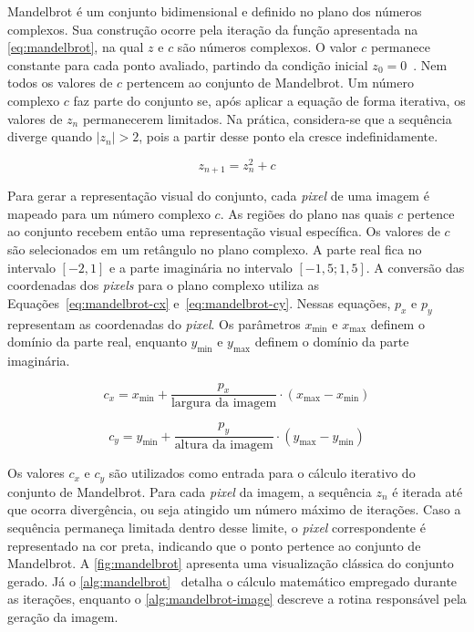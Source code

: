 Mandelbrot é um conjunto bidimensional e definido no plano dos números complexos. Sua construção ocorre pela iteração da função apresentada na \autoref{eq:mandelbrot}, na qual $z$ e $c$ são números complexos. O valor $c$ permanece constante para cada ponto avaliado, partindo da condição inicial $z_0 = 0$~\cite{devaney1999}. Nem todos os valores de $c$ pertencem ao conjunto de Mandelbrot. Um número complexo $c$ faz parte do conjunto se, após aplicar a equação de forma iterativa, os valores de $z_n$ permanecerem limitados. Na prática, considera-se que a sequência diverge quando $|z_n| > 2$, pois a partir desse ponto ela cresce indefinidamente.

\begin{equation}
    \label{eq:mandelbrot}
    z_{n + 1} = z_n^{2} + c
\end{equation}

Para gerar a representação visual do conjunto, cada \textit{pixel} de uma imagem é mapeado para um número complexo $c$. As regiões do plano nas quais $c$ pertence ao conjunto recebem então uma representação visual específica. Os valores de $c$ são selecionados em um retângulo no plano complexo. A parte real fica no intervalo $[-2, 1]$ e a parte imaginária no intervalo $[-1,5;1,5]$. A conversão das coordenadas dos \textit{pixels} para o plano complexo utiliza as Equações~\ref{eq:mandelbrot-cx} e~\ref{eq:mandelbrot-cy}. Nessas equações, $p_x$ e $p_y$ representam as coordenadas do \textit{pixel}. Os parâmetros $x_{\text{min}}$ e $x_{\text{max}}$ definem o domínio da parte real, enquanto $y_{\text{min}}$ e $y_{\text{max}}$ definem o domínio da parte imaginária.

\begin{equation}
    \label{eq:mandelbrot-cx}
    c_x = x_{\text{min}} + \frac{p_x}{\text{largura da imagem}} \cdot (x_{\text{max}} - x_{\text{min}})
\end{equation}

\begin{equation}
    \label{eq:mandelbrot-cy}
    c_y = y_{\text{min}} + \frac{p_y}{\text{altura da imagem}} \cdot (y_{\text{max}} - y_{\text{min}})
\end{equation}

Os valores $c_x$ e $c_y$ são utilizados como entrada para o cálculo iterativo do conjunto de Mandelbrot. Para cada \textit{pixel} da imagem, a sequência $z_n$ é iterada até que ocorra divergência, ou seja atingido um número máximo de iterações. Caso a sequência permaneça limitada dentro desse limite, o \textit{pixel} correspondente é representado na cor preta, indicando que o ponto pertence ao conjunto de Mandelbrot. A \autoref{fig:mandelbrot} apresenta uma visualização clássica do conjunto gerado. Já o \autoref{alg:mandelbrot}~\cite{debianBenchmarksGame} detalha o cálculo matemático empregado durante as iterações, enquanto o \autoref{alg:mandelbrot-image} descreve a rotina responsável pela geração da imagem.

